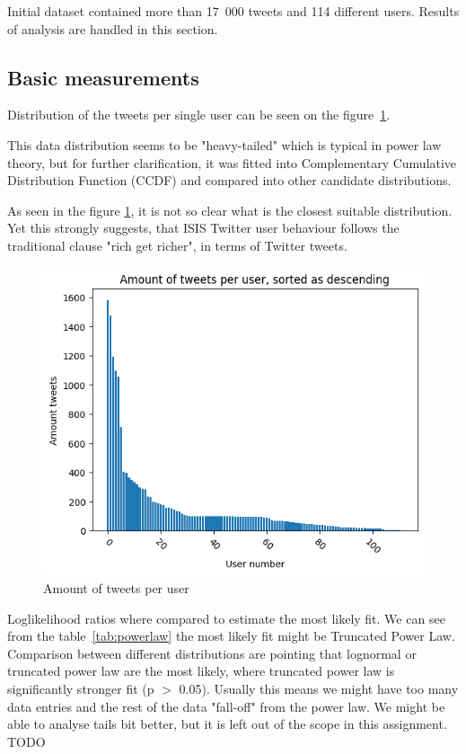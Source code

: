 \documentclass[conference]{IEEEtran}
\begin{document}
Initial dataset contained more than 17~000 tweets and 114 different users.
Results of analysis are handled in this section.

\subsection{Basic measurements}

Distribution of the tweets per single user can be seen on the figure~\ref{fig:amount-tweets-user}.

This data distribution seems to be "heavy-tailed" which is typical in power law theory, but for further clarification,
it was fitted into Complementary Cumulative Distribution Function (CCDF) and compared into other candidate distributions.

As seen in the figure \ref{fig:amount-tweets-user}, it is not so clear what is the closest suitable distribution.
Yet this strongly suggests, that ISIS Twitter user behaviour follows the traditional clause "rich get richer", in terms of Twitter tweets.

\begin{figure}
    \includegraphics[scale=0.6]{figures/amount_tweets_per_user}
     \caption{Amount of tweets per user}
    \label{fig:amount-tweets-user}
\end{figure}

Loglikelihood ratios where compared to estimate the most likely fit.
We can see from the table~\ref{tab:powerlaw} the most likely fit might be Truncated Power Law.
Comparison between different distributions are pointing that lognormal or truncated power law are the most likely, where truncated power law is significantly stronger fit (p $>$ 0.05).
Usually this means we might have too many data entries and the rest of the data "fall-off" from the power law.
We might be able to analyse tails bit better, but it is left out of the scope in this assignment.
TODO
\end{document}

